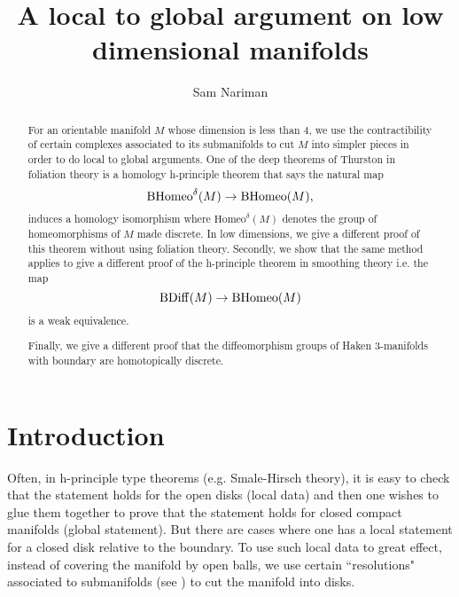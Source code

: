 \documentclass[a4paper]{amsart}
\title{A local to global argument on low dimensional manifolds}
\author{Sam Nariman}
\theoremstyle{definition}
\theoremstyle{remark}
\newcommand\BDiff{\mathrm{BDiff}}
\newcommand{\BH}{\mathrm{B}\text{\textnormal{Homeo}}}
\newcommand{\tdH}{\text{Homeo}^{\delta}}
\newcommand{\BdH}{\mathrm{B}\text{\textnormal{Homeo}}^{\delta}}
\numberwithin{equation}{section}
\begin{document}
\begin{abstract}
For   an orientable manifold $M$ whose dimension is less than $4$, we use the contractibility of certain complexes associated to its submanifolds to cut $M$ into simpler pieces in order to do  local to global arguments. One of the deep theorems of Thurston in foliation theory is a homology h-principle theorem  that says the natural map 
\[
\BdH(M)\to \BH(M),
\]
induces a homology isomorphism where $\tdH(M)$ denotes the group of homeomorphisms of $M$ made discrete. In low dimensions, we give a different proof of this theorem without using foliation theory. Secondly, we show that the same method applies to give  a different proof of the h-principle theorem in  smoothing theory i.e. the map 
\[ \BDiff(M)\to \BH(M)\]
is a weak equivalence. 

Finally,  we give a different proof that the diffeomorphism groups of Haken $3$-manifolds with boundary are homotopically discrete.%
\end{abstract}
\maketitle
\section{Introduction}
Often, in h-principle type theorems (e.g. Smale-Hirsch theory), it is easy to check that the statement holds for the open disks (local data) and then one wishes to glue them together to prove that the statement holds for closed compact manifolds (global statement). But there are cases where one has a local statement for a closed disk relative to the boundary. To use such local data to great effect, instead of covering the manifold by open balls, we use certain ``resolutions" associated to submanifolds (see ) to cut the manifold into disks.
\end{document}
